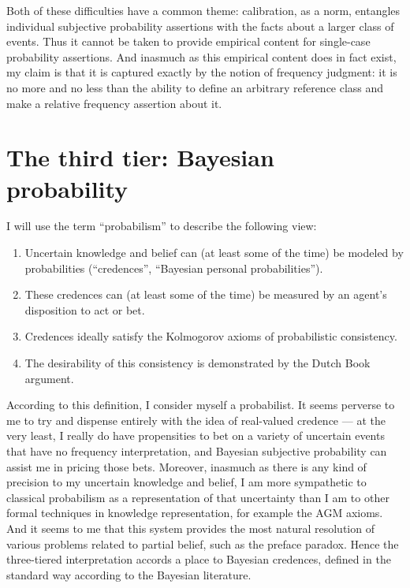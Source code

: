 \documentclass[letterpaper,12pt]{article}
\begin{document}
Both of these difficulties have a common theme: calibration, as a norm, entangles individual subjective probability assertions with the facts about a larger class of events. Thus it cannot be taken to provide empirical content for single-case probability assertions. And inasmuch as this empirical content does in fact exist, my claim is that it is captured exactly by the notion of frequency judgment: it is no more and no less than the ability to define an arbitrary reference class and make a relative frequency assertion about it.



\section{The third tier: Bayesian probability}
I will use the term ``probabilism'' to describe the following view:

\begin{enumerate}
\item
Uncertain knowledge and belief can (at least some of the time) be modeled by probabilities (``credences'', ``Bayesian personal probabilities'').
\item
These credences can (at least some of the time) be measured by an agent's disposition to act or bet.
\item
Credences ideally satisfy the Kolmogorov axioms of probabilistic consistency.
\item
The desirability of this consistency is demonstrated by the Dutch Book argument.
\end{enumerate}

According to this definition, I consider myself a probabilist. It seems perverse to me to try and dispense entirely with the idea of real-valued credence --- at the very least, I really do have propensities to bet on a variety of uncertain events that have no frequency interpretation, and Bayesian subjective probability can assist me in pricing those bets. Moreover, inasmuch as there is any kind of precision to my uncertain knowledge and belief, I am more sympathetic to classical probabilism as a representation of that uncertainty than I am to other formal techniques in knowledge representation, for example the AGM axioms. And it seems to me that this system provides the most natural resolution of various problems related to partial belief, such as the preface paradox. Hence the three-tiered interpretation accords a place to Bayesian credences, defined in the standard way according to the Bayesian literature.
\end{document}
